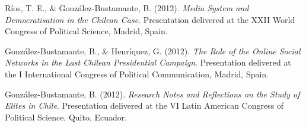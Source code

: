 \begin{publications}
\begin{benumerate}{72}
\item{\small Ríos, T. E., \& González-Bustamante, B. (2012). {\itshape Media System and Democratisation in the Chilean Case}. Presentation delivered at the XXII World Congress of Political Science, Madrid, Spain.}\vspace{1mm}

\item{\small González-Bustamante, B., \& Henríquez, G. (2012). {\itshape The Role of the Online Social Networks in the Last Chilean Presidential Campaign}. Presentation delivered at the I International Congress of Political Communication, Madrid, Spain.}\vspace{1mm}

\item{\small González-Bustamante, B. (2012). {\itshape Research Notes and Reflections on the Study of Elites in Chile}. Presentation delivered at the VI Latin American Congress of Political Science, Quito, Ecuador.}

\end{benumerate}

\end{publications}
